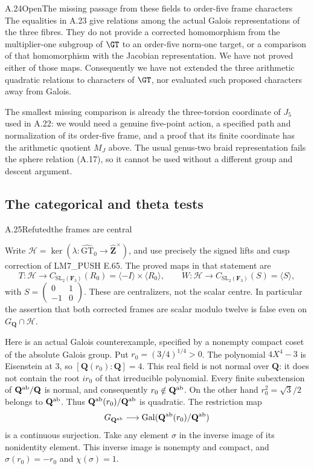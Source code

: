 \begin{statement}{A.24}{Open}{The missing passage from these fields to order-five frame characters}
The equalities in A.23 give relations among the actual Galois
representations of the three fibres. They do not provide a
corrected homomorphism from the multiplier-one subgroup of
$\GT$ to an order-five norm-one target, or a comparison of that
homomorphism with the Jacobian representation. We have not
proved either of those maps. Consequently we have not extended
the three arithmetic quadratic relations to characters of
$\GT$, nor evaluated such proposed characters away from Galois.
\end{statement}
The smallest missing comparison is already the three-torsion
coordinate of $J_5$ used in A.22: we would need a genuine
five-point action, a specified path and normalization of its
order-five frame, and a proof that its finite coordinate has
the arithmetic quotient $M_J$ above. The usual genus-two braid
representation fails the sphere relation (A.17), so it cannot
be used without a different group and descent argument.

\subsection{The categorical and theta tests}


\begin{statement}{A.25}{Refuted}{the frames are central}
\end{statement}
Write $\mathcal H=\ker(\lambda:\widehat{\mathrm{GT}}_0\to
\widehat{\mathbf Z}^{\times})$, and use precisely the signed lifts and
cusp correction of LM7\_PUSH E.65.  The proved maps in that statement are
\[
 T:\mathcal H\longrightarrow
 C_{\mathrm{SL}_2(\mathbf F_3)}(R_0)
 =\langle-I\rangle\times\langle R_0\rangle,
 \qquad
 W:\mathcal H\longrightarrow
 C_{\mathrm{SL}_2(\mathbf F_3)}(S)=\langle S\rangle,
\]
with $S=\left(\begin{smallmatrix}0&1\\-1&0\end{smallmatrix}\right)$.
These are centralizers, not the scalar centre.  In particular the assertion
that both corrected frames are scalar modulo twelve is false even on
$G_{\mathbf Q}\cap\mathcal H$.

Here is an actual Galois counterexample, specified by a nonempty compact
coset of the absolute Galois group.  Put $r_0=(3/4)^{1/4}>0$.
The polynomial $4X^4-3$ is Eisenstein at $3$, so
$[\mathbf Q(r_0):\mathbf Q]=4$.  This real field is not normal over
$\mathbf Q$: it does not contain the root $ir_0$ of that irreducible
polynomial.  Every finite subextension of $\mathbf Q^{\rm ab}/\mathbf Q$
is normal, and consequently $r_0\notin\mathbf Q^{\rm ab}$.
On the other hand $r_0^2=\sqrt3/2$ belongs to $\mathbf Q^{\rm ab}$.
Thus $\mathbf Q^{\rm ab}(r_0)/\mathbf Q^{\rm ab}$ is quadratic.
The restriction map
\[
 G_{\mathbf Q^{\rm ab}}\longrightarrow
 \operatorname{Gal}(\mathbf Q^{\rm ab}(r_0)/\mathbf Q^{\rm ab})
\]
is a continuous surjection.  Take any element $\sigma$ in the inverse
image of its nonidentity element.  This inverse image is nonempty and
compact, and $\sigma(r_0)=-r_0$ and $\chi(\sigma)=1$.

